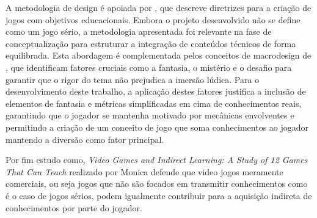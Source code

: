 A metodologia de design é apoiada por \textcite{SeriousGames-Frutuoso}, que descreve diretrizes para a 
criação de jogos com objetivos educacionais. Embora o projeto desenvolvido não se define 
como um jogo sério, a metodologia
 apresentada foi relevante na fase de conceptualização para estruturar a integração de 
 conteúdos técnicos de forma equilibrada. Esta abordagem é complementada pelos conceitos 
 de macrodesign de \textcite{shay2022scaffolding}, que identificam fatores cruciais como a 
 fantasia, o mistério e o desafio para garantir que o rigor do tema não prejudica a imersão 
 lúdica. Para o desenvolvimento deste trabalho, a aplicação destes fatores justifica a 
 inclusão de elementos de fantasia e métricas simplificadas em cima de conhecimentos 
 reais, garantindo que o jogador se mantenha motivado por mecânicas envolventes 
 e permitindo a criação de um conceito de jogo que soma conhecimentos ao jogador mantendo 
 a diversão como fator principal.

Por fim estudo como, \textit{Video Games and Indirect Learning: A Study of 12 Games That Can Teach} realizado
por Monica \textcite{miller2021video} defende que video jogos meramente comerciais, ou
seja jogos que não são focados em transmitir conhecimentos como é o caso de jogos sérios,
podem igualmente contribuir para a aquisição indireta de conhecimentos por parte do jogador.
